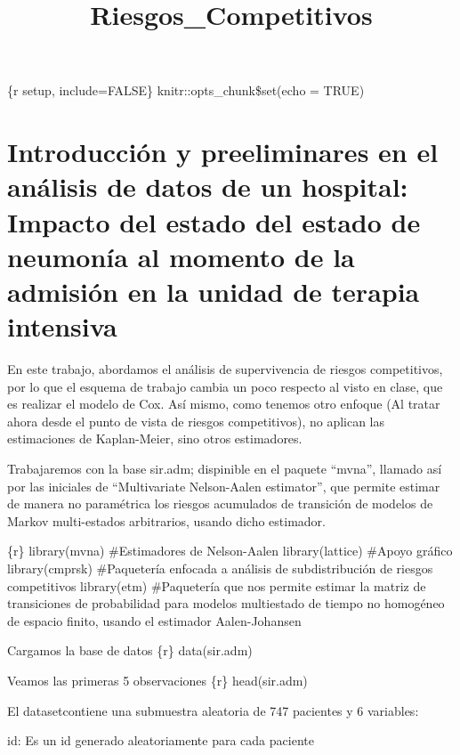 \documentclass[
]{article}
\title{Riesgos\_Competitivos}
\author{}
\date{\vspace{-2.5em}}
\begin{document}
\maketitle

\{r setup, include=FALSE\} knitr::opts\_chunk\$set(echo = TRUE)

\hypertarget{introducciuxf3n-y-preeliminares-en-el-anuxe1lisis-de-datos-de-un-hospital-impacto-del-estado-del-estado-de-neumonuxeda-al-momento-de-la-admisiuxf3n-en-la-unidad-de-terapia-intensiva}{%
\section{Introducción y preeliminares en el análisis de datos de un
hospital: Impacto del estado del estado de neumonía al momento de la
admisión en la unidad de terapia
intensiva}\label{introducciuxf3n-y-preeliminares-en-el-anuxe1lisis-de-datos-de-un-hospital-impacto-del-estado-del-estado-de-neumonuxeda-al-momento-de-la-admisiuxf3n-en-la-unidad-de-terapia-intensiva}}

En este trabajo, abordamos el análisis de supervivencia de riesgos
competitivos, por lo que el esquema de trabajo cambia un poco respecto
al visto en clase, que es realizar el modelo de Cox. Así mismo, como
tenemos otro enfoque (Al tratar ahora desde el punto de vista de riesgos
competitivos), no aplican las estimaciones de Kaplan-Meier, sino otros
estimadores.

Trabajaremos con la base sir.adm; dispinible en el paquete ``mvna'',
llamado así por las iniciales de ``Multivariate Nelson-Aalen
estimator'', que permite estimar de manera no paramétrica los riesgos
acumulados de transición de modelos de Markov multi-estados arbitrarios,
usando dicho estimador.

\{r\} library(mvna) \#Estimadores de Nelson-Aalen library(lattice)
\#Apoyo gráfico library(cmprsk) \#Paquetería enfocada a análisis de
subdistribución de riesgos competitivos library(etm) \#Paquetería que
nos permite estimar la matriz de transiciones de probabilidad para
modelos multiestado de tiempo no homogéneo de espacio finito, usando el
estimador Aalen-Johansen

Cargamos la base de datos \{r\} data(sir.adm)

Veamos las primeras 5 observaciones \{r\} head(sir.adm)

El datasetcontiene una submuestra aleatoria de 747 pacientes y 6
variables:

id: Es un id generado aleatoriamente para cada paciente
\end{document}
